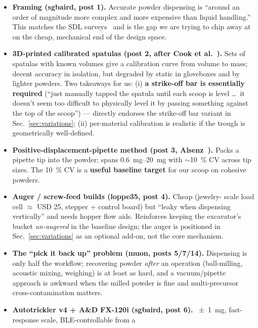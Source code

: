 \documentclass[11pt,a4paper]{article}
\begin{document}
\begin{itemize}[leftmargin=*]
  \item \textbf{Framing (sgbaird, post 1).} Accurate powder dispensing is
    ``around an order of magnitude more complex and more expensive than
    liquid handling.''  This matches the SDL
    surveys~\cite{tom2024selfdrivinglaboratoriesfor} and is the gap we are
    trying to chip away at on the cheap, mechanical end of the design space.
  \item \textbf{3D-printed calibrated spatulas (post 2, after Cook
    et al.~\cite{cook2021guideto}).} Sets of spatulas with known volumes
    give a calibration curve from volume to mass; decent accuracy in
    isolation, but degraded by static in gloveboxes and by lighter powders.
    Two takeaways for us: (i) \textbf{a strike-off bar is essentially
    required} (``just manually tapped the spatula until each scoop is level
    \dots\ it doesn't seem too difficult to physically level it by passing
    something against the top of the scoop'') --- directly endorses the
    strike-off bar variant in Sec.~\ref{sec:variations}; (ii) per-material
    calibration is realistic if the trough is geometrically well-defined.
  \item \textbf{Positive-displacement-pipette method (post 3,
    Alsenz~\cite{alsenz2011powderpickinganinexpensive}).} Packs a pipette
    tip into the powder; spans \SIrange{0.6}{20}{\milli\gram} with
    \(\sim\)\SI{10}{\percent} CV across tip sizes. The
    \SI{10}{\percent} CV is a \textbf{useful baseline target} for our scoop
    on cohesive powders.
  \item \textbf{Auger / screw-feed builds (loppe35, post 4).} Cheap (jewelry-
    scale load cell \(\approx\) USD 25, stepper + control board) but ``leaky
    when dispensing vertically'' and needs hopper flow aids. Reinforces
    keeping the excavator's bucket \emph{un-augered} in the baseline design;
    the auger is positioned in Sec.~\ref{sec:variations} as an optional
    add-on, not the core mechanism.
  \item \textbf{The ``pick it back up'' problem (muon, posts 5/7/14).}
    Dispensing is only half the workflow; recovering powder \emph{after}
    an operation (ball-milling, acoustic mixing, weighing) is at least as
    hard, and a vacuum/pipette approach is awkward when the milled powder
    is fine and multi-precursor cross-contamination matters.
  \item \textbf{Autotrickler v4 + A\&D FX-120i (sgbaird, post 6).}
    \SI{\pm1}{\milli\gram}, fast-response scale, BLE-controllable from a

\end{itemize}
\end{document}
